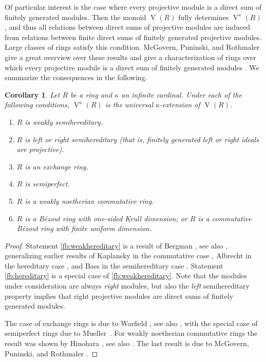 \documentclass[a4paper,11pt,oneside]{amsart}
\newtheorem{cor}[teor]{Corollary}
\theoremstyle{remark}
\DeclareMathOperator{\Vmon}{V}
\begin{document}
Of particular interest is the case where every projective module is a direct sum of finitely generated modules.
Then the monoid $\Vmon(R)$ fully determines $\Vmon^{\kappa}(R)$, and thus all relations between direct sums of projective modules are induced from relations between finite direct sums of finitely generated projective modules.
Large classes of rings satisfy this condition.
McGovern, Puninski, and Rothmaler \cite{McGovernPuninskiRothmaler07} give a great overview over these results and give a characterization of rings over which every projective module is a direct sum of finitely generated modules \cite[Theorem 4.2]{McGovernPuninskiRothmaler07}.
We summarize the consequences in the following.

\begin{cor} \label{cor:fin-braided}
  Let $R$ be a ring and $\kappa$ an infinite cardinal.
  Under each of the following conditions, $\Vmon^{\kappa}(R)$ is the universal $\kappa$-extension of $\Vmon(R)$.
  \begin{enumerate}
  \item \label{fb:weakhereditary}$R$ is weakly semihereditary.
  \item \label{fb:hereditary} $R$ is left or right semihereditary \textup(that is, finitely generated left or right ideals are projective\textup).
  \item \label{fb:exchange} $R$ is an exchange ring.
  \item \label{fb:semiperfect} $R$ is semiperfect.
  \item \label{fb:noetherian} $R$ is a weakly noetherian commutative ring.
  \item \label{fb:bezout} $R$ is a Bézout ring with one-sided Krull dimension; or $R$ is a commutative Bézout ring with finite uniform dimension.
  \end{enumerate}
\end{cor}

\begin{proof}
  Statement \ref{fb:weakhereditary} is a result of Bergman \cite[Proposition 4.4]{Bergman72}, see also \cite[Section 5]{McGovernPuninskiRothmaler07}, generalizing earlier results of Kaplansky in the commutative case \cite{Kaplansky58}, Albrecht in the hereditary case \cite{Albrecht61}, and Bass in the semihereditary case \cite[Theorem 3]{Bass64}.
  Statement \ref{fb:hereditary} is a special case of \ref{fb:weakhereditary}.
  Note that the modules under consideration are always \emph{right} modules, but also the \emph{left} semihereditary property implies that right projective modules are direct sums of finitely generated modules.

  The case of exchange rings is due to Warfield \cite[Corollary 3]{Warfield72}, see also \cite[Fact 3.6]{McGovernPuninskiRothmaler07}, with the special case of semiperfect rings due to Mueller~\cite[Theorem 3]{Mueller70}.
  For weakly noetherian commutative rings the result was shown by Hinohara \cite{Hinohara63}, see also \cite[Fact 3.1]{McGovernPuninskiRothmaler07}.
  The last result is due to McGovern, Puninski, and Rothmaler \cite[Corollary 8.2 and Proposition 8.6]{McGovernPuninskiRothmaler07}.
\end{proof}
\end{document}
